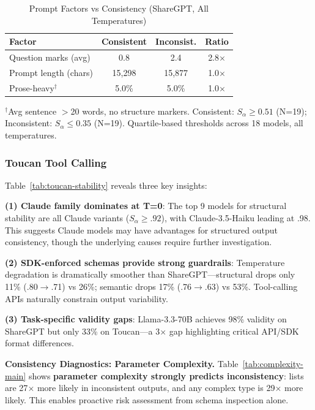 \documentclass{article}
\theoremstyle{plain}
\theoremstyle{definition}
\begin{document}
\begin{table}[h]
\centering
\caption{Prompt Factors vs Consistency (ShareGPT, All Temperatures)}
\label{tab:ambiguity-main}
\scriptsize
\begin{tabular}{@{}lccc@{}}
\toprule
\textbf{Factor} & \textbf{Consistent} & \textbf{Inconsist.} & \textbf{Ratio} \\
\midrule
Question marks (avg) & 0.8 & 2.4 & 2.8$\times$ \\
Prompt length (chars) & 15,298 & 15,877 & 1.0$\times$ \\
Prose-heavy$^\dagger$ & 5.0\% & 5.0\% & 1.0$\times$ \\
\bottomrule
\end{tabular}

\vspace{0.3em}
\raggedright\scriptsize $^\dagger$Avg sentence $>$20 words, no structure markers. Consistent: $S_\alpha \geq 0.51$ (N=19); Inconsistent: $S_\alpha \leq 0.35$ (N=19). Quartile-based thresholds across 18 models, all temperatures.
\end{table}

\subsubsection{Toucan Tool Calling}
Table~\ref{tab:toucan-stability} reveals three key insights:

\textbf{(1) Claude family dominates at T=0}: The top 9 models for structural stability are all Claude variants ($S_\alpha \geq .92$), with Claude-3.5-Haiku leading at .98. This suggests Claude models may have advantages for structured output consistency, though the underlying causes require further investigation.

\textbf{(2) SDK-enforced schemas provide strong guardrails}: Temperature degradation is dramatically smoother than ShareGPT---structural drops only 11\% (.80$\to$.71) vs 26\%; semantic drops 17\% (.76$\to$.63) vs 53\%. Tool-calling APIs naturally constrain output variability.

\textbf{(3) Task-specific validity gaps}: Llama-3.3-70B achieves 98\% validity on ShareGPT but only 33\% on Toucan---a 3$\times$ gap highlighting critical API/SDK format differences.

\textbf{Consistency Diagnostics: Parameter Complexity.} Table~\ref{tab:complexity-main} shows \textbf{parameter complexity strongly predicts inconsistency}: lists are 27$\times$ more likely in inconsistent outputs, and any complex type is 29$\times$ more likely. This enables proactive risk assessment from schema inspection alone.
\end{document}
